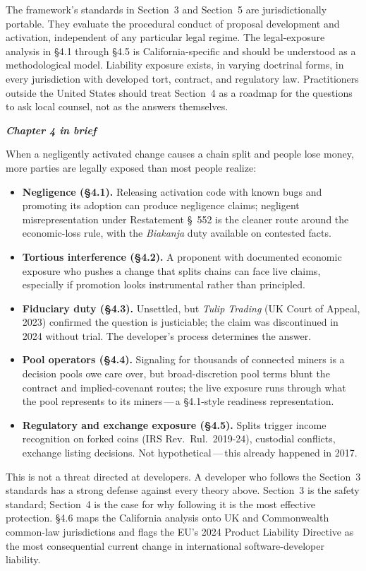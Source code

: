 \documentclass[11pt, twoside, openright]{book}
\newcommand{\sect}[1]{\S#1}
\newcommand{\peheader}[1]{{\itshape\bfseries #1}\par\vspace{4pt}}
\begin{document}
\medskip

The framework's standards in Section~3 and Section~5 are jurisdictionally portable. They evaluate the procedural conduct of proposal development and activation, independent of any particular legal regime. The legal-exposure analysis in \sect{4.1} through \sect{4.5} is California-specific and should be understood as a methodological model. Liability exposure exists, in varying doctrinal forms, in every jurisdiction with developed tort, contract, and regulatory law. Practitioners outside the United States should treat Section~4 as a roadmap for the questions to ask local counsel, not as the answers themselves.

\needspace{4in}
\begin{plainenglish}
\peheader{Chapter 4 in brief}

When a negligently activated change causes a chain split and people lose money, more parties are legally exposed than most people realize:

\begin{itemize}
  \item \textbf{Negligence (\sect{4.1}).} Releasing activation code with known bugs and promoting its adoption can produce negligence claims; negligent misrepresentation under Restatement \S~552 is the cleaner route around the economic-loss rule, with the \textit{Biakanja} duty available on contested facts.
  \item \textbf{Tortious interference (\sect{4.2}).} A proponent with documented economic exposure who pushes a change that splits chains can face live claims, especially if promotion looks instrumental rather than principled.
  \item \textbf{Fiduciary duty (\sect{4.3}).} Unsettled, but \textit{Tulip Trading} (UK Court of Appeal, 2023) confirmed the question is justiciable; the claim was discontinued in 2024 without trial. The developer's process determines the answer.
  \item \textbf{Pool operators (\sect{4.4}).} Signaling for thousands of connected miners is a decision pools owe care over, but broad-discretion pool terms blunt the contract and implied-covenant routes; the live exposure runs through what the pool represents to its miners\,---\,a \sect{4.1}-style readiness representation.
  \item \textbf{Regulatory and exchange exposure (\sect{4.5}).} Splits trigger income recognition on forked coins (IRS Rev.~Rul.~2019-24), custodial conflicts, exchange listing decisions. Not hypothetical\,---\,this already happened in 2017.
\end{itemize}

This is not a threat directed at developers. A developer who follows the Section~3 standards has a strong defense against every theory above. Section~3 is the safety standard; Section~4 is the case for why following it is the most effective protection. \sect{4.6} maps the California analysis onto UK and Commonwealth common-law jurisdictions and flags the EU's 2024 Product Liability Directive as the most consequential current change in international software-developer liability.
\end{plainenglish}
\end{document}
